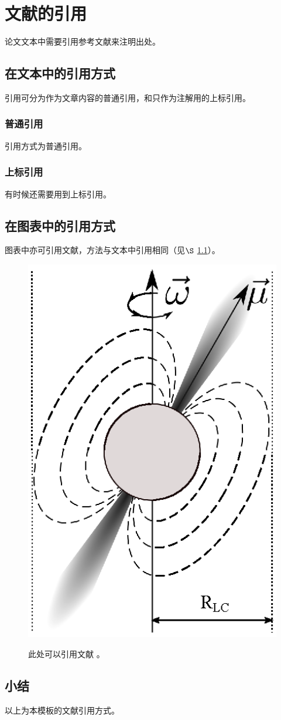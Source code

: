 \section{文献的引用} \label{sec:Ref}
论文文本中需要引用参考文献来注明出处。

\subsection{在文本中的引用方式} \label{ssec:Txtref} %
引用可分为作为文章内容的普通引用，和只作为注解用的上标引用。

\subsubsection{普通引用} \label{sssec:Tcite} %
引用方式\cite{Designated}为普通引用。

\subsubsection{上标引用} \label{sssec:Tupcite}
有时候还需要用到上标引用。

\subsection{在图表中的引用方式} \label{ssec:PnTref}
图表中亦可引用文献，方法与文本中引用相同（见$\S$ \ref{ssec:Txtref}）。

\begin{figure}[!ht]
  \centering
  \includegraphics[width=.3\textwidth]{img/lighthouse.eps}\\
  \caption{此处可以引用文献 。}\label{fig:Lighthouse}%
\end{figure}


\subsection{小结}
以上为本模板的文献引用方式。
